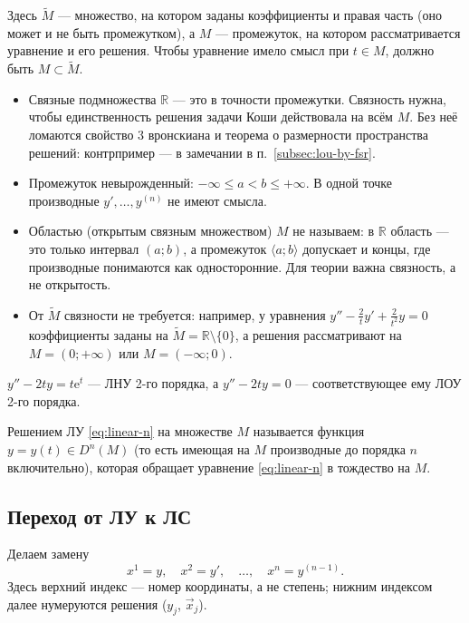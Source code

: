 \documentclass[12pt,a4paper]{article}
\numberwithin{equation}{section}
\newcommand{\R}{\mathbb{R}}
\newcommand{\vect}[1]{\vec{#1}}
\newcommand{\e}{\mathrm{e}}
\begin{document}
Здесь \(\tilde{M}\) --- множество, на котором заданы коэффициенты и правая часть (оно может и не быть промежутком), а \(M\) --- промежуток, на котором рассматривается уравнение и его решения. Чтобы уравнение имело смысл при \(t\in M\), должно быть \(M\subset\tilde{M}\).

\begin{remarkHSE}
\begin{itemize}
\item Связные подмножества \(\R\) --- это в точности промежутки. Связность нужна, чтобы единственность решения задачи Коши действовала на всём \(M\). Без неё ломаются свойство 3 вронскиана и теорема о размерности пространства решений: контрпример --- в замечании в п.~\ref{subsec:lou-by-fsr}.
\item Промежуток невырожденный: \(-\infty\le a<b\le+\infty\). В одной точке производные \(y',\ldots,y^{(n)}\) не имеют смысла.
\item Областью (открытым связным множеством) \(M\) не называем: в \(\R\) область --- это только интервал \((a;b)\), а промежуток \(\langle a;b\rangle\) допускает и концы, где производные понимаются как односторонние. Для теории важна связность, а не открытость.
\item От \(\tilde{M}\) связности не требуется: например, у уравнения \(y''-\frac{2}{t}y'+\frac{2}{t^2}y=0\) коэффициенты заданы на \(\tilde{M}=\R\setminus\{0\}\), а решения рассматривают на \(M=(0;+\infty)\) или \(M=(-\infty;0)\).
\end{itemize}
\end{remarkHSE}

\begin{exampleHSE}
\(y''-2ty=t\e^{t}\) --- ЛНУ 2-го порядка, а \(y''-2ty=0\) --- соответствующее ему ЛОУ 2-го порядка.
\end{exampleHSE}

\begin{definitionHSE}[Решение ЛУ]
Решением ЛУ \eqref{eq:linear-n} на множестве \(M\) называется функция \(y=y(t)\in D^n(M)\) (то есть имеющая на \(M\) производные до порядка \(n\) включительно), которая обращает уравнение \eqref{eq:linear-n} в тождество на \(M\).
\end{definitionHSE}

\subsection{Переход от ЛУ к ЛС}

Делаем замену
\begin{equation}
x^1=y,\quad x^2=y',\quad\ldots,\quad x^n=y^{(n-1)}.
\label{eq:linear-n-subst}
\end{equation}
Здесь верхний индекс --- номер координаты, а не степень; нижним индексом далее нумеруются решения (\(y_j\), \(\vect{x}_j\)).
\end{document}
